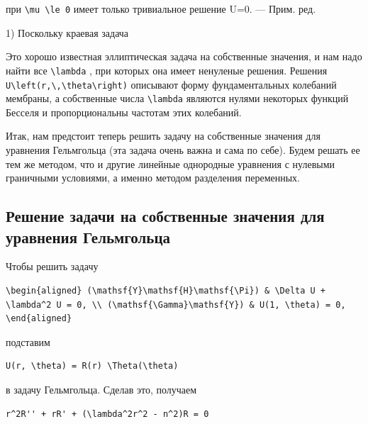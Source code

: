 \documentclass[
  ukrainian,
]{article}
\begin{document}
при \texttt{\textbackslash{}mu\ \textbackslash{}le\ 0} имеет только
тривиальное решение U=0. --- Прим. ред.

1) Поскольку краевая задача

Это хорошо известная эллиптическая задача на собственные значения, и нам
надо найти все \texttt{\textbackslash{}lambda} , при которых она имеет
ненуленые решения. Решения
\texttt{U\textbackslash{}left(r,\textbackslash{},\textbackslash{}theta\textbackslash{}right)}
описывают форму фундаментальных колебаний мембраны, а собственные числа
\texttt{\textbackslash{}lambda} являются нулями некоторых функций
Бесселя и пропорциональны частотам этих колебаний.

Итак, нам предстоит теперь решить задачу на собственные значения для
уравнения Гельмгольца (эта задача очень важна и сама по себе). Будем
решать ее тем же методом, что и другие линейные однородные уравнения с
нулевыми граничными условиями, а именно методом разделения переменных.

\subsection{Решение задачи на собственные значения для уравнения
Гельмгольца}\label{ux440ux435ux448ux435ux43dux438ux435-ux437ux430ux434ux430ux447ux438-ux43dux430-ux441ux43eux431ux441ux442ux432ux435ux43dux43dux44bux435-ux437ux43dux430ux447ux435ux43dux438ux44f-ux434ux43bux44f-ux443ux440ux430ux432ux43dux435ux43dux438ux44f-ux433ux435ux43bux44cux43cux433ux43eux43bux44cux446ux430}

Чтобы решить задачу

\begin{verbatim}
\begin{aligned} (\mathsf{Y}\mathsf{H}\mathsf{\Pi}) & \Delta U + \lambda^2 U = 0, \\ (\mathsf{\Gamma}\mathsf{Y}) & U(1, \theta) = 0, \end{aligned}
\end{verbatim}

подставим

\begin{verbatim}
U(r, \theta) = R(r) \Theta(\theta)
\end{verbatim}

в задачу Гельмгольца. Сделав это, получаем

\begin{verbatim}
r^2R'' + rR' + (\lambda^2r^2 - n^2)R = 0
\end{verbatim}
\end{document}
